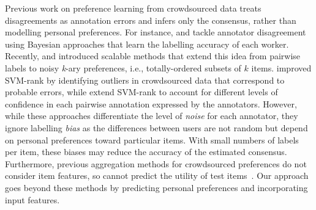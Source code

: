 Previous work on preference learning from crowdsourced data 
treats disagreements as annotation errors and infers only the consensus,
rather than modelling personal preferences.
For instance, 
\citet{chen2013pairwise} and \citet{wang2016blind} 
tackle annotator disagreement %
using Bayesian approaches that learn the labelling accuracy of each worker.
Recently, \citet{pan2018stagewise} and \citet{han2018robust} 
introduced scalable methods that extend this idea from pairwise labels
to noisy \textit{k}-ary preferences,
i.e., totally-ordered subsets of $k$ items.
\citet{fu2016robust} improved SVM-rank by identifying outliers in crowdsourced data
that correspond to probable errors,
while \citet{uchida2017entity} extend SVM-rank to account for different levels of confidence in each pairwise annotation expressed by the annotators.
However, while these approaches differentiate the level of \emph{noise}
for each annotator,
they ignore labelling \emph{bias} 
as the differences between users are not random but depend on personal preferences toward particular items.
With small numbers of labels per item, these biases may reduce the accuracy of the estimated
consensus.
Furthermore, previous aggregation methods for crowdsourced preferences
do not consider item features,
so cannot predict the utility of test items~\citep{chen2013pairwise,wang2016blind,han2018robust,pan2018stagewise,li2018hybrid}.
Our approach goes beyond these methods
by predicting personal preferences
and incorporating input features.


